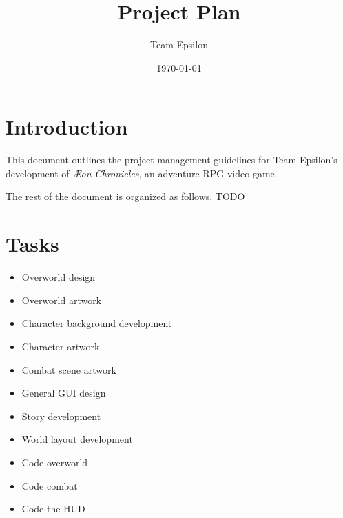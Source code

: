 \documentclass[12pt,titlepage]{article}
\title{Project Plan}
\author{Team Epsilon}
\date{\today}
\newcommand\gametitle{\textit{\AE on Chronicles}}
\begin{document}
\maketitle

\section{Introduction}

This document outlines the project management guidelines for Team Epsilon's
development of \gametitle, an adventure RPG video game.

The rest of the document is organized as follows. TODO

\section{Tasks}

\begin{itemize}
    \item Overworld design
    \item Overworld artwork
    \item Character background development
    \item Character artwork
    \item Combat scene artwork
    \item General GUI design
    \item Story development
    \item World layout development
    \item Code overworld
    \item Code combat
    \item Code the HUD
\end{itemize}
\end{document}
